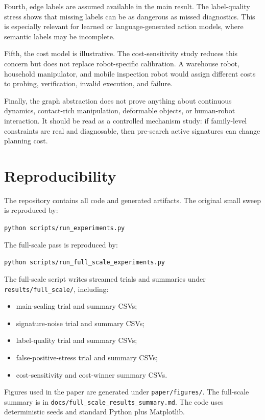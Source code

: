 \documentclass{article}
\begin{document}
Fourth, edge labels are assumed available in the main result. The label-quality stress shows that missing labels can be as dangerous as missed diagnostics. This is especially relevant for learned or language-generated action models, where semantic labels may be incomplete.

Fifth, the cost model is illustrative. The cost-sensitivity study reduces this concern but does not replace robot-specific calibration. A warehouse robot, household manipulator, and mobile inspection robot would assign different costs to probing, verification, invalid execution, and failure.

Finally, the graph abstraction does not prove anything about continuous dynamics, contact-rich manipulation, deformable objects, or human-robot interaction. It should be read as a controlled mechanism study: if family-level constraints are real and diagnosable, then pre-search active signatures can change planning cost.

\section{Reproducibility}

The repository contains all code and generated artifacts. The original small sweep is reproduced by:
\begin{center}
\texttt{python scripts/run\_experiments.py}
\end{center}
The full-scale pass is reproduced by:
\begin{center}
\texttt{python scripts/run\_full\_scale\_experiments.py}
\end{center}
The full-scale script writes streamed trials and summaries under \texttt{results/full\_scale/}, including:
\begin{itemize}
    \item main-scaling trial and summary CSVs;
    \item signature-noise trial and summary CSVs;
    \item label-quality trial and summary CSVs;
    \item false-positive-stress trial and summary CSVs;
    \item cost-sensitivity and cost-winner summary CSVs.
\end{itemize}
Figures used in the paper are generated under \texttt{paper/figures/}. The full-scale summary is in \texttt{docs/full\_scale\_results\_summary.md}. The code uses deterministic seeds and standard Python plus Matplotlib.
\end{document}
